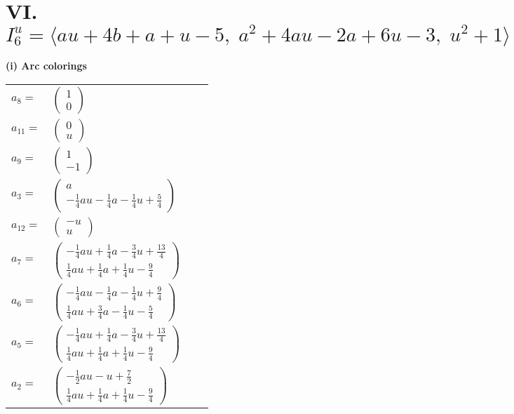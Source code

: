 \documentclass[1p]{elsarticle_modified}
\theoremstyle{definition}
\begin{document}
\centering \section*{VI. $I^u_{6}= \langle a u+4 b+a+u-5,\;a^2+4 a u-2 a+6 u-3,\;u^2+1 \rangle$}
\flushleft \textbf{(i) Arc colorings}\\
\begin{tabular}{m{7pt} m{180pt} m{7pt} m{180pt} }
\flushright $a_{8}=$&$\begin{pmatrix}1\\0\end{pmatrix}$ \\
\flushright $a_{11}=$&$\begin{pmatrix}0\\u\end{pmatrix}$ \\
\flushright $a_{9}=$&$\begin{pmatrix}1\\-1\end{pmatrix}$ \\
\flushright $a_{3}=$&$\begin{pmatrix}a\\-\frac{1}{4} a u-\frac{1}{4} a-\frac{1}{4} u+\frac{5}{4}\end{pmatrix}$ \\
\flushright $a_{12}=$&$\begin{pmatrix}- u\\u\end{pmatrix}$ \\
\flushright $a_{7}=$&$\begin{pmatrix}-\frac{1}{4} a u+\frac{1}{4} a-\frac{3}{4} u+\frac{13}{4}\\\frac{1}{4} a u+\frac{1}{4} a+\frac{1}{4} u-\frac{9}{4}\end{pmatrix}$ \\
\flushright $a_{6}=$&$\begin{pmatrix}-\frac{1}{4} a u-\frac{1}{4} a-\frac{1}{4} u+\frac{9}{4}\\\frac{1}{4} a u+\frac{3}{4} a-\frac{1}{4} u-\frac{5}{4}\end{pmatrix}$ \\
\flushright $a_{5}=$&$\begin{pmatrix}-\frac{1}{4} a u+\frac{1}{4} a-\frac{3}{4} u+\frac{13}{4}\\\frac{1}{4} a u+\frac{1}{4} a+\frac{1}{4} u-\frac{9}{4}\end{pmatrix}$ \\
\flushright $a_{2}=$&$\begin{pmatrix}-\frac{1}{2} a u- u+\frac{7}{2}\\\frac{1}{4} a u+\frac{1}{4} a+\frac{1}{4} u-\frac{9}{4}\end{pmatrix}$ \\

\end{tabular}
\end{document}
